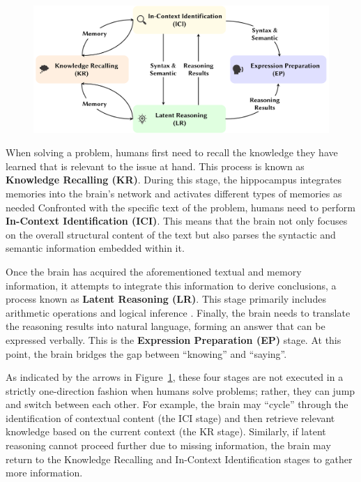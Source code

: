 \documentclass[12pt,letterpaper]{article}
\begin{document}
\begin{figure}[htbp]
    \centering
    \includegraphics[width=0.8\linewidth]{figures/four_steps.pdf}
    \caption{}
    \label{fig:four_steps}
\end{figure}

When solving a problem, humans first need to recall the knowledge they have learned that is relevant to the issue at hand. This process is known as \textbf{Knowledge Recalling (KR)}. During this stage, the hippocampus integrates memories into the brain's network \citep{SquireMemory} and activates different types of memories as needed  
Confronted with the specific text of the problem, humans need to perform \textbf{In-Context Identification (ICI)}. This means that the brain not only focuses on the overall structural content of the text \citep{GeneralStructure} but also parses the syntactic \citep{Syntax} and semantic \citep{Semantic} information embedded within it.

Once the brain has acquired the aforementioned textual and memory information, it attempts to integrate this information to derive conclusions, a process known as \textbf{Latent Reasoning (LR)}. This stage primarily includes arithmetic operations \citep{ReasoningNumber} and logical inference \citep{ReasoningLogic}.
Finally, the brain needs to translate the reasoning results into natural language, forming an answer that can be expressed verbally. This is the \textbf{Expression Preparation (EP)} stage. At this point, the brain bridges the gap between ``knowing'' and ``saying''.\citep{LanguageExpress}

As indicated by the arrows in Figure~\ref{fig:four_steps}, these four stages are not executed in a strictly one-direction fashion when humans solve problems; rather, they can jump and switch between each other. For example, the brain may ``cycle'' through the identification of contextual content (the ICI stage) and then retrieve relevant knowledge based on the current context (the KR stage). Similarly, if latent reasoning cannot proceed further due to missing information, the brain may return to the Knowledge Recalling and In-Context Identification stages to gather more information.
\end{document}
